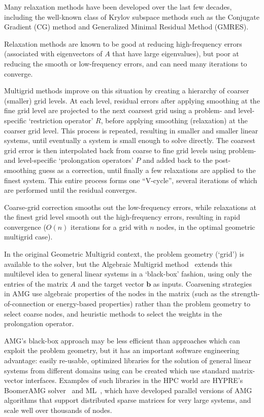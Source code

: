 \documentclass{svproc}
\begin{document}
Many relaxation methods have been developed over the last few decades, including the well-known class of Krylov subspace methods such as the Conjugate Gradient (CG) method and Generalized Minimal Residual Method (GMRES).

Relaxation methods are known to be good at reducing high-frequency errors (associated with eigenvectors of $A$ that have large eigenvalues), but poor at reducing the smooth or low-frequency errors, and can need many iterations to converge.

Multigrid methods improve on this situation by creating a hierarchy of coarser (smaller) grid levels. At each level, residual errors after applying smoothing at the fine grid level are projected to the next coarsest grid using a problem- and level-specific `restriction operator' $R$, before applying smoothing (relaxation) at the coarser grid level. This process is repeated, resulting in smaller and smaller linear systems, until eventually a system is small enough to solve directly. The coarsest grid error is then interpolated back from coarse to fine grid levels using problem- and level-specific `prolongation operators' $P$ and added back to the post-smoothing guess as a correction, until finally a few relaxations are applied to the finest system. This entire process forms one ``V-cycle'', several iterations of which are performed until the residual converges.

Coarse-grid correction smooths out the low-frequency errors, while relaxations at the finest grid level smooth out the high-frequency errors, resulting in rapid convergence ($O(n)$ iterations for a grid with $n$ nodes, in the optimal geometric multigrid case).

In the original Geometric Multigrid context, the problem geometry (`grid') is available to the solver, but the Algebraic Multigrid method~\cite{AMGorginal} extends this multilevel idea to general linear systems in a `black-box' fashion, using only the entries of the matrix $A$ and the target vector $\mathbf{b}$ as inputs. Coarsening strategies in AMG use algebraic properties of the nodes in the matrix (such as the strength-of-connection or energy-based properties) rather than the problem geometry to select coarse nodes, and heuristic methods to select the weights in the prolongation operator. 

AMG's black-box approach may be less efficient than approaches which can exploit the problem geometry, but it has an important software engineering advantage: easily re-usable, optimized libraries for the solution of general linear systems from different domains using can be created which use standard matrix-vector interfaces. Examples of such libraries in the HPC world are HYPRE's BoomerAMG solver~\cite{hypre} and ML~\cite{ml-guide}, which have developed parallel versions of AMG algorithms that support distributed sparse matrices for very large systems, and scale well over thousands of nodes. 
\end{document}
